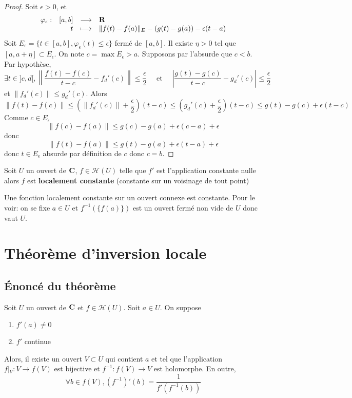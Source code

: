 \begin{proof}
Soit $\epsilon >0$, et \[
\begin{array}{rrcl}
    \varphi_\epsilon:& [a,b] & \longrightarrow & \mathbf R \\
               & t & \longmapsto & \displaystyle \|f(t)-f(a)\|_E-(g(t)-g(a))-\epsilon(t-a)
\end{array}
\] 
Soit $E_\epsilon=\{t \in  [a, b], \varphi_\epsilon(t)\leq \epsilon\}$ fermé de $[a, b]$. Il existe  $\eta>0$ tel que  $[a, a+\eta]\subset E_\epsilon$. On note  $c=\max E_\epsilon>a$. Supposons par l'absurde que  $c<b$. Par hypothèse,  \[
    \exists  t \in  ]c, d[, \left\|\frac{f(t)-f(c)}{t-c}-f_d'(c)\right\|\leq \frac{\epsilon}{2}\quad \text{ et } \quad  \left| \frac{g(t)-g(c)}{t-c}-g_d'(c) \right|\leq \frac{\epsilon}{2}
\] 
et $\|f_d'(c)\|\leq g_d'(c)$. Alors 
\[
    \|f(t)-f(c)\|\leq \left( \|f_d'(c)\|+\frac{\epsilon}{2} \right) (t-c)\leq \left( g_d'(c)+ \frac{\epsilon}{2} \right)(t-c)\leq g(t)-g(c)+\epsilon(t-c)
\] 
Comme $c \in  E_\epsilon$ \[
    \|f(c)-f(a)\|\leq  g(c)-g(a)+\epsilon(c-a)+\epsilon
\] 
donc \[
    \|f(t)-f(a)\|\leq g(t)-g(a)+\epsilon(t-a)+\epsilon
\] 
donc $t \in  E_\epsilon$ absurde par définition de $c$ donc $c=b$.
\end{proof}

\begin{cor}
    Soit $U$ un ouvert de  $\mathbf C$, $f \in  \mathcal  H(U)$ telle que $f'$ est l'application constante nulle alors  $f$ est \textbf{localement constante} (constante sur un voisinage de tout point)
\end{cor}

\begin{rem}
    Une fonction localement constante sur un ouvert connexe est constante. Pour le voir: on se fixe $a \in  U$ et $f^{-1}(\{f(a)\})$ est un ouvert fermé non vide de $U$ donc vaut  $U$.
\end{rem}

\section{Théorème d'inversion locale}

\subsection{Énoncé du théorème}

\begin{thm}
    Soit $U$ un ouvert de  $\mathbf C$ et $f \in  \mathcal  H(U)$. Soit $a \in  U$. On suppose \begin{enumerate}[label=(\emph{\roman*})]
    \item $f'(a)\neq 0$
    \item $f'$ continue
\end{enumerate}
Alors, il existe un ouvert $V\subset U$ qui contient $a$ et tel que l'application  $f\left|_{V}\right.:V\longrightarrow f(V)$ est bijective et $f^{-1}:f(V)\longrightarrow V$ est holomorphe. En outre, \[
    \forall  b \in  f(V), (f^{-1})'(b)=\frac1{f'(f^{-1}(b))}
\] 
\end{thm}

